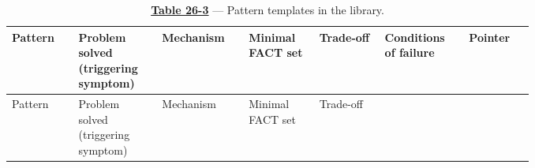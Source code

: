 \nopagebreak[4]
\begin{longtable}[]{@{}
  >{\raggedright\arraybackslash}p{0.1098\linewidth}
  >{\raggedright\arraybackslash}p{0.1098\linewidth}
  >{\raggedright\arraybackslash}p{0.1098\linewidth}
  >{\raggedright\arraybackslash}p{0.1098\linewidth}
  >{\raggedright\arraybackslash}p{0.1098\linewidth}
  >{\raggedright\arraybackslash}p{0.1098\linewidth}
  >{\raggedright\arraybackslash}p{0.1098\linewidth}@{}}
\caption[\textbf{\hyperref[tab:26.3]{Table 26-3}} --- Pattern templates in the library]{\textbf{\hyperref[tab:26.3]{Table 26-3}} --- Pattern templates in the library.}\tabularnewline
\toprule\noalign{}
\begin{minipage}[b]{\linewidth}\raggedright
Pattern
\end{minipage} & \begin{minipage}[b]{\linewidth}\raggedright
Problem solved (triggering symptom)
\end{minipage} & \begin{minipage}[b]{\linewidth}\raggedright
Mechanism
\end{minipage} & \begin{minipage}[b]{\linewidth}\raggedright
Minimal FACT set
\end{minipage} & \begin{minipage}[b]{\linewidth}\raggedright
Trade-off
\end{minipage} & \begin{minipage}[b]{\linewidth}\raggedright
Conditions of failure
\end{minipage} & \begin{minipage}[b]{\linewidth}\raggedright
Pointer
\end{minipage} \\
\midrule\noalign{}
\endfirsthead
\toprule\noalign{}
\begin{minipage}[b]{\linewidth}\raggedright
Pattern
\end{minipage} & \begin{minipage}[b]{\linewidth}\raggedright
Problem solved (triggering symptom)
\end{minipage} & \begin{minipage}[b]{\linewidth}\raggedright
Mechanism
\end{minipage} & \begin{minipage}[b]{\linewidth}\raggedright
Minimal FACT set
\end{minipage} & \begin{minipage}[b]{\linewidth}\raggedright
Trade-off
\end{minipage} & \begin{minipage}[b]{\linewidth}\raggedright

\end{minipage}
\end{longtable}
